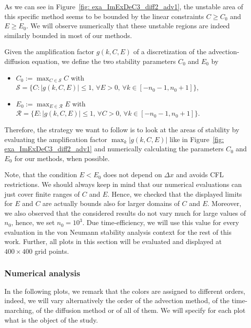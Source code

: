 As we can see in Figure~\ref{fig: exa_ImExDeC3_diff2_adv1}, the unstable area of this specific method seems to be bounded by the linear constraints $C\geq C_0$ and $E\geq E_0$. We will observe numerically that these unstable regions are indeed similarly bounded in most of our methods.
\begin{definition}
	Given the amplification factor $g(k,C,E)$ of a discretization of the advection-diffusion equation, we define the two stability parameters $C_0$ and $E_0$ by
	\begin{itemize}
		\item $C_0:=\max_{C\in \mathcal{S}} C$ with $\mathcal{S}=\lbrace C: \lvert g(k,C,E)\rvert \leq 1, \, \forall E>0, \,\forall k \in [-n_0-1,n_0+1] \rbrace$,
		\item $E_0:=\max_{E\in \mathcal{R}}E$ with $\mathcal{R}= \lbrace E: \lvert g(k,C,E)\rvert \leq 1,\, \forall C>0,\,\forall k \in [-n_0-1,n_0+1]\rbrace .$
	\end{itemize}
\end{definition}
Therefore, the strategy we want to follow is to look at the areas of stability by evaluating the amplification factor $\max_k |g(k,C,E)|$ like in Figure~\ref{fig: exa_ImExDeC3_diff2_adv1} and numerically calculating the parameters $C_0$ and $E_0$ for our methods, when possible.

Note, that the condition $E<E_0$ does not depend on $\Delta x$ and avoids CFL restrictions. We should always keep in mind that our numerical evaluations can just cover finite ranges of $C$ and $E$. 
Hence, we checked that the displayed limits for $E$ and $C$ are actually bounds also for larger domains of $C$ and $E$.
Moreover, we also observed that the considered results do not vary much for large values of $n_0$, hence, we set $n_0=10^3$. Due time-efficiency, we will use this value for every evaluation in the von Neumann stability analysis context for the rest of this work. Further, all plots in this section will be evaluated and displayed at $400\times 400$ grid points.
\subsubsection{Numerical analysis}
In the following plots, we remark that the colors are assigned to different orders, indeed, we will vary alternatively the order of the advection method, of the time-marching, of the diffusion method or of all of them. We will specify for each plot what is the object of the study.

